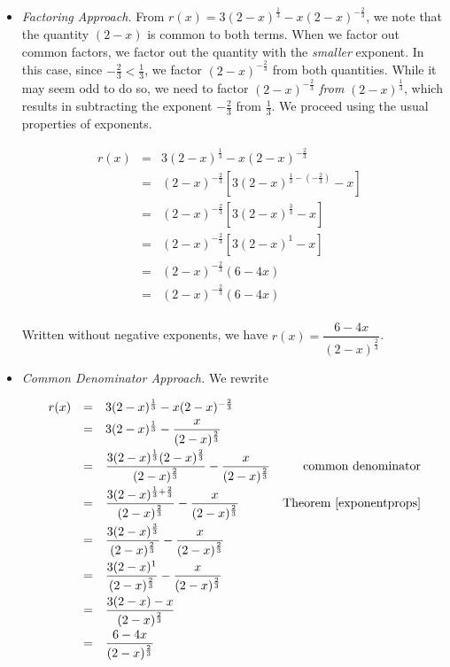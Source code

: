 \documentclass{ximera}
\begin{document}
\begin{ex}
\begin{enumerate}
\begin{itemize}

\item  \textit{Factoring Approach.}  From $r(x) = 3 (2-x)^{\frac{1}{3}} - x (2-x)^{-\frac{2}{3}}$, we note that the quantity $(2-x)$ is common to both terms.  When we factor out common factors, we factor out the quantity with the \textit{smaller} exponent.  In this case, since $-\frac{2}{3} < \frac{1}{3}$, we factor $(2-x)^{-\frac{2}{3}}$ from both quantities.  While it may seem odd to do so, we need to factor $(2-x)^{-\frac{2}{3}}$ \textit{from} $(2-x)^{\frac{1}{3}}$, which results in subtracting the exponent $-\frac{2}{3}$ from $\frac{1}{3}$.  We proceed using the usual properties of exponents.

\[ \begin{array}{rclr}

r(x)  & = & 3 (2-x)^{\frac{1}{3}} - x (2-x)^{-\frac{2}{3}} & \\ [3pt]
      & = & (2-x)^{-\frac{2}{3}} \left[ 3 (2-x)^{\frac{1}{3} - \left(-\frac{2}{3}\right)} - x\right] & \\ [6pt]
      & = & (2-x)^{-\frac{2}{3}}\left[3(2-x)^{\frac{3}{3}} - x\right] & \\ [3pt]
      & = & (2-x)^{-\frac{2}{3}}\left[3(2-x)^{1} - x\right] &  \\ [3pt]
      & = & (2-x)^{-\frac{2}{3}}\left(6-4x\right) & \\ [3pt]
      & = & (2-x)^{-\frac{2}{3}}\left(6-4x\right) & \\
      
\end{array}\]

Written without negative exponents, we have $r(x) = \dfrac{6-4x}{(2-x)^{\frac{2}{3}}}$.

\newpage

\item \textit{Common Denominator Approach.}  We rewrite 

\[ \begin{array}{rclr}

r(x)  & = & 3 (2-x)^{\frac{1}{3}} - x (2-x)^{-\frac{2}{3}} & \\ [3pt]
      & = & 3 (2-x)^{\frac{1}{3}} - \dfrac{x}{(2-x)^{\frac{2}{3}}} & \\ [10pt]
      & = & \dfrac{3 (2-x)^{\frac{1}{3}}(2-x)^{\frac{2}{3}}}{(2-x)^{\frac{2}{3}}} - \dfrac{x}{(2-x)^{\frac{2}{3}}} & \text{common denominator} \\ [10pt]
      & = & \dfrac{3 (2-x)^{\frac{1}{3} + \frac{2}{3}}}{(2-x)^{\frac{2}{3}}} - \dfrac{x}{(2-x)^{\frac{2}{3}}} & \text{Theorem \ref{exponentprops}}  \\ [10pt]
      & = & \dfrac{3 (2-x)^{\frac{3}{3}}}{(2-x)^{\frac{2}{3}}} - \dfrac{x}{(2-x)^{\frac{2}{3}}} & \\ [10pt]
      & = & \dfrac{3 (2-x)^1}{(2-x)^{\frac{2}{3}}} - \dfrac{x}{(2-x)^{\frac{2}{3}}} &  \\ [10pt]
      & = & \dfrac{3 (2-x) - x}{(2-x)^{\frac{2}{3}}} & \\ [10pt]
      & = & \dfrac{6-4x}{(2-x)^{\frac{2}{3}}} & \\


\end{array}\]
\end{itemize}
\end{enumerate}
\end{ex}
\end{document}
